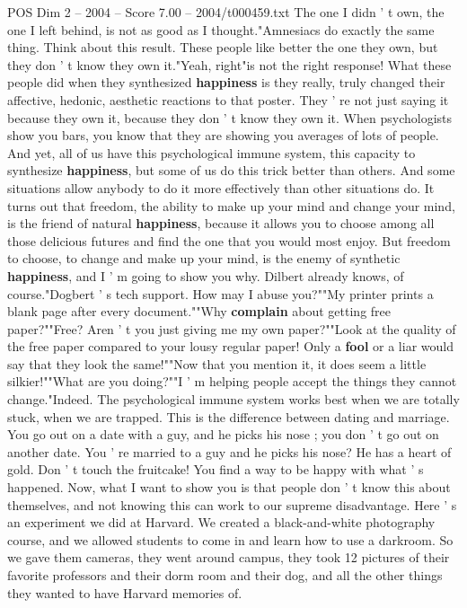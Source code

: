 \begin{textsample}{POS Dim 2 – 2004 – Score 7.00 – 2004/t000459.txt}
The one I didn ' t own, the one I left behind, is not as good as I thought."Amnesiacs do exactly the same thing.
Think about this result.
These people like better the one they own, but they don ' t know they own it."Yeah, right"is not the right response!
What these people did when they synthesized \textbf{happiness} is they really, truly changed their affective, hedonic, aesthetic reactions to that poster.
They ' re not just saying it because they own it, because they don ' t know they own it.
When psychologists show you bars, you know that they are showing you averages of lots of people.
And yet, all of us have this psychological immune system, this capacity to synthesize \textbf{happiness}, but some of us do this trick better than others.
And some situations allow anybody to do it more effectively than other situations do.
It turns out that freedom, the ability to make up your mind and change your mind, is the friend of natural \textbf{happiness}, because it allows you to choose among all those delicious futures and find the one that you would most enjoy.
But freedom to choose, to change and make up your mind, is the enemy of synthetic \textbf{happiness}, and I ' m going to show you why.
Dilbert already knows, of course."Dogbert ' s tech support.
How may I abuse you?""My printer prints a blank page after every document.""Why \textbf{complain} about getting free paper?""Free?
Aren ' t you just giving me my own paper?""Look at the quality of the free paper compared to your lousy regular paper!
Only a \textbf{fool} or a liar would say that they look the same!""Now that you mention it, it does seem a little silkier!""What are you doing?""I ' m helping people accept the things they cannot change."Indeed.
The psychological immune system works best when we are totally stuck, when we are trapped.
This is the difference between dating and marriage.
You go out on a date with a guy, and he picks his nose ; you don ' t go out on another date.
You ' re married to a guy and he picks his nose?
He has a heart of gold.
Don ' t touch the fruitcake!
You find a way to be happy with what ' s happened.
Now, what I want to show you is that people don ' t know this about themselves, and not knowing this can work to our supreme disadvantage.
Here ' s an experiment we did at Harvard.
We created a black-and-white photography course, and we allowed students to come in and learn how to use a darkroom.
So we gave them cameras, they went around campus, they took 12 pictures of their favorite professors and their dorm room and their dog, and all the other things they wanted to have Harvard memories of.

\end{textsample}
